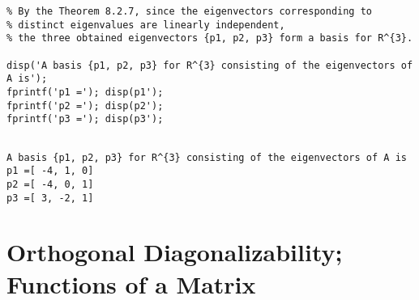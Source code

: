 \begin{sol}
\begin{enumerate}
\begin{verbatim}
% By the Theorem 8.2.7, since the eigenvectors corresponding to 
% distinct eigenvalues are linearly independent,
% the three obtained eigenvectors {p1, p2, p3} form a basis for R^{3}.

disp('A basis {p1, p2, p3} for R^{3} consisting of the eigenvectors of A is');
fprintf('p1 ='); disp(p1'); 
fprintf('p2 ='); disp(p2'); 
fprintf('p3 ='); disp(p3');
\end{verbatim}


\begin{outputs}

\begin{verbatim}

A basis {p1, p2, p3} for R^{3} consisting of the eigenvectors of A is
p1 =[ -4, 1, 0]
p2 =[ -4, 0, 1]
p3 =[ 3, -2, 1]
\end{verbatim}
\end{outputs}


\end{enumerate}
\end{sol}










\section{Orthogonal Diagonalizability; Functions of a Matrix}


